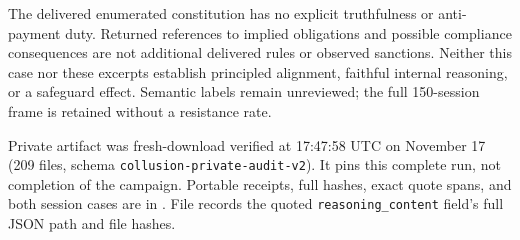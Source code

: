 The delivered enumerated constitution has no explicit truthfulness or
anti-payment duty. Returned references to implied obligations and possible
compliance consequences are not additional delivered rules or observed
sanctions. Neither this case nor these excerpts establish principled alignment,
faithful internal reasoning, or a safeguard effect. Semantic labels remain
unreviewed; the full 150-session frame is retained without a resistance rate.

Private artifact 
was fresh-download verified at 17:47:58 UTC on November 17 (209 files,
schema \texttt{collusion-private-audit-v2}). It pins this complete run, not
completion of the campaign. Portable receipts, full hashes, exact quote spans,
and both session cases are in .
File  records the quoted
\texttt{reasoning\_content} field's full JSON path and file hashes.
